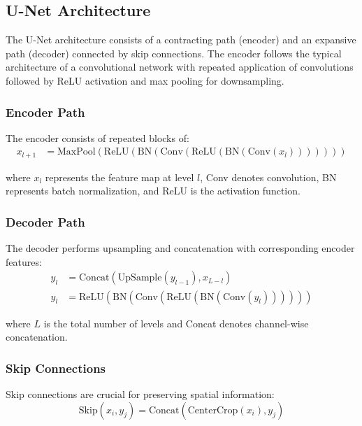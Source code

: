 \documentclass[a4paper, journal]{IEEEtran}
\begin{document}
\subsection{U-Net Architecture}
The U-Net architecture consists of a contracting path (encoder) and an expansive path (decoder) connected by skip connections. The encoder follows the typical architecture of a convolutional network with repeated application of convolutions followed by ReLU activation and max pooling for downsampling.

\subsubsection{Encoder Path}
The encoder consists of repeated blocks of:
\begin{equation}
    \begin{aligned}
        x_{l+1} & = \text{MaxPool}(\text{ReLU}(\text{BN}(\text{Conv}(\text{ReLU}(\text{BN}(\text{Conv}(x_l)))))))
    \end{aligned}
\end{equation}

where $x_l$ represents the feature map at level $l$, Conv denotes convolution, BN represents batch normalization, and ReLU is the activation function.

\subsubsection{Decoder Path}
The decoder performs upsampling and concatenation with corresponding encoder features:
\begin{equation}
    \begin{aligned}
        y_l & = \text{Concat}(\text{UpSample}(y_{l-1}), x_{L-l})                              \\
        y_l & = \text{ReLU}(\text{BN}(\text{Conv}(\text{ReLU}(\text{BN}(\text{Conv}(y_l))))))
    \end{aligned}
\end{equation}

where $L$ is the total number of levels and Concat denotes channel-wise concatenation.

\subsubsection{Skip Connections}
Skip connections are crucial for preserving spatial information:
\begin{equation}
    \text{Skip}(x_i, y_j) = \text{Concat}(\text{CenterCrop}(x_i), y_j)
\end{equation}
\end{document}
